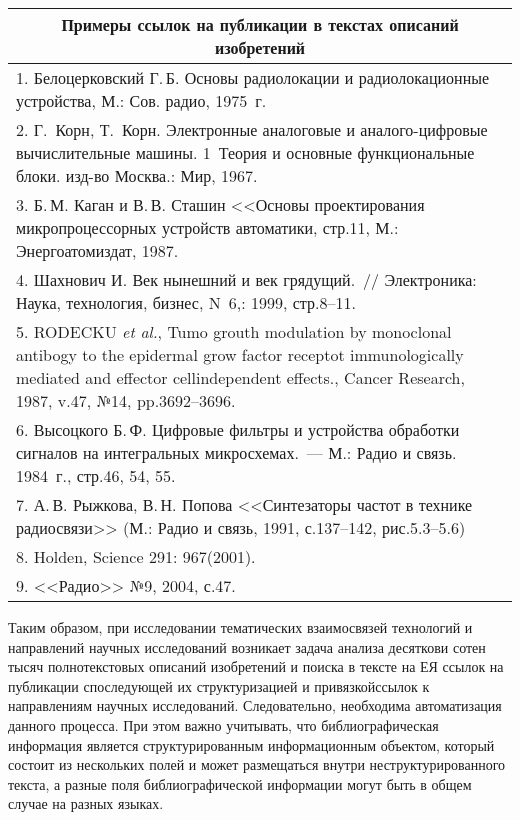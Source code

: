 \begin{multicols}{2}
             \begin{table*}\small
       \begin{center}
      \begin{tabular}{|p{150mm}|}
      \multicolumn{1}{c}{ Примеры ссылок на публикации в текстах описаний 
изобретений}\\[6pt]
\hline
1.  Белоцерковский Г.\,Б. Основы радиолокации и радиолокационные устройства, М.: 
Сов. радио, 1975~г.\\
\hline
2. Г.~Корн, Т.~Корн. Электронные аналоговые и аналого-цифровые вычислительные 
машины. 1~Теория и основные функциональные блоки. изд-во Москва.: Мир, 1967.\\
\hline
3. Б.\,М. Каган и В.\,В. Сташин <<Основы проектирования микропроцессорных устройств 
автоматики, стр.11, М.: Энергоатомиздат, 1987.\\
\hline
4. Шахнович И. Век нынешний и век грядущий.~// Электроника: Наука, технология, 
бизнес, N~6,: 1999, стр.8--11.\\
\hline
5. RODECKU \textit{et al.}, Tumo grouth modulation by monoclonal antibogy to the epidermal 
grow factor receptot immunologically mediated and effector cellindependent effects., Cancer 
Research, 1987, v.47, №14, pp.3692--3696.\\
\hline
6. Высоцкого Б.\,Ф. Цифровые фильтры и устройства обработки сигналов на 
интегральных микросхемах.~--- М.: Радио и связь. 1984~г., стр.46, 54, 55.\\
\hline
7. А.\,В. Рыжкова, В.\,Н. Попова <<Синтезаторы частот в технике радиосвязи>> (М.: 
Радио и связь, 1991, с.137--142, рис.5.3--5.6)\\
\hline
8.  Holden, Science 291: 967(2001).\\
\hline
9.  <<Радио>>  №9, 2004,  с.47.\\
      \hline
      \end{tabular}
      \end{center}
      \vspace*{-6pt}
      \end{table*}
      
      Таким образом, при исследовании тематических взаимосвязей технологий и направлений 
научных исследований возникает задача анализа десятков\linebreak и сотен тысяч полнотекстовых 
описаний изобрете\-ний и поиска в тексте на ЕЯ ссылок на публика\-ции с\linebreak последующей их 
структуризацией и \mbox{привязкой}\linebreak ссылок к направлениям научных исследований. Следовательно, 
необходима автоматизация данного процесса. При этом важно учитывать, что 
биб\-лио\-гра\-фи\-че\-ская информация является структурированным информационным объектом, 
который состоит из нескольких полей и может размещаться внутри неструктурированного 
текста, а разные поля библиографической информации могут быть в общем случае на разных 
языках.
      

\end{multicols}
